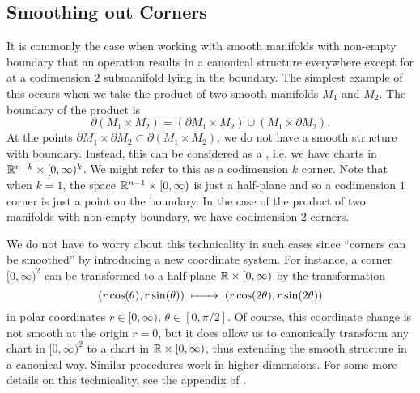 \subsection{Smoothing out Corners}\label{sec:smoothing-corners}

It is commonly the case when working with smooth manifolds with non-empty boundary that an operation results in a canonical structure everywhere except for at a codimension $2$ submanifold lying in the boundary. The simplest example of this occurs when we take the product of two smooth manifolds $M_1$ and $M_2$. The boundary of the product is
\[
		\partial(M_1\times M_2) = (\partial M_1 \times M_2) \cup (M_1\times \partial M_2).
\]
At the points $\partial M_1\times \partial M_2\subset \partial (M_1\times M_2)$, we do not have a smooth structure with boundary. Instead, this can be considered as a , i.e. we have charts in $\mathbb{R}^{n-k}\times [0,\infty)^k$. We might refer to this as a codimension $k$ corner. Note that when $k=1$, the space $\mathbb{R}^{n-1}\times [0,\infty)$ is just a half-plane and so a codimension $1$ corner is just a point on the boundary. In the case of the product of two manifolds with non-empty boundary, we have codimension $2$ corners. 

We do not have to worry about this technicality in such cases since ``corners can be smoothed'' by introducing a new coordinate system. For instance, a corner $[0,\infty)^2$ can be transformed to a half-plane $\mathbb{R}\times [0,\infty)$ by the transformation
\[
	(r\cos(\theta), r\sin(\theta) )\lkxmapsto (r\cos(2\theta), r\sin(2\theta))
\]
in polar coordinates $r\in[0,\infty)$, $\theta\in [0,\pi/2]$. Of course, this coordinate change is not smooth at the origin $r=0$, but it does allow us to canonically transform any chart in $[0,\infty)^2$ to a chart in $\mathbb{R}\times [0,\infty)$, thus extending the smooth structure in a canonical way. Similar procedures work in higher-dimensions. For some more details on this technicality, see the appendix of \cite{milnor1958manifolds}.

\smallrule

